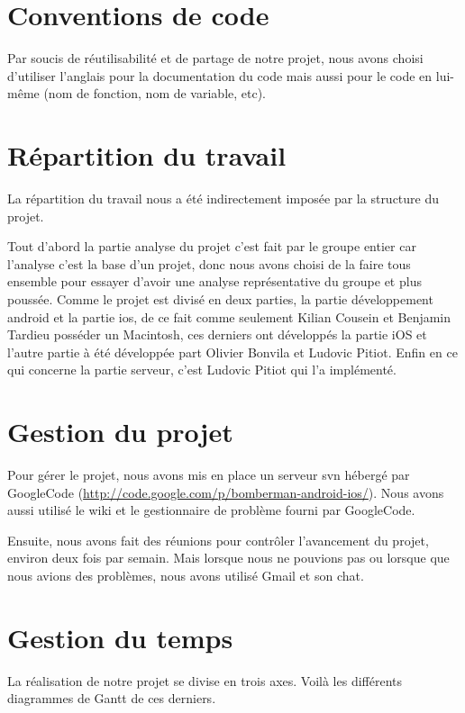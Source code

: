 \section{Conventions de code}
	Par soucis de réutilisabilité et de partage de notre projet, nous avons choisi d'utiliser l'anglais pour la documentation du code mais aussi pour le code en lui-même (nom de fonction, nom de variable, etc).


\section{Répartition du travail}
	La répartition du travail nous a été indirectement imposée par la structure du projet. 
	
	Tout d'abord la partie analyse du projet c'est fait par le groupe entier car
	l'analyse c'est la base d'un projet, donc nous avons choisi de la faire tous ensemble pour essayer d'avoir une analyse représentative du groupe et plus poussée. Comme le projet est divisé en deux parties, la partie développement \gls{android} et la partie \gls{ios}, de ce fait comme seulement Kilian Cousein et Benjamin Tardieu posséder un Macintosh, ces derniers ont développés la partie iOS et l'autre partie à été développée part Olivier Bonvila et Ludovic Pitiot. Enfin en ce qui concerne la partie serveur, c'est Ludovic Pitiot qui l'a implémenté.
	
	
\section{Gestion du projet}
	Pour gérer le projet, nous avons mis en place un serveur \gls{svn} hébergé par GoogleCode (\url{http://code.google.com/p/bomberman-android-ios/}). Nous avons aussi utilisé le wiki et le gestionnaire de problème fourni par GoogleCode.
	
	Ensuite, nous avons fait des réunions pour contrôler l'avancement du projet, environ deux fois par semain. Mais lorsque nous ne pouvions pas ou lorsque que nous avions des problèmes, nous avons utilisé Gmail et son chat.
	

\section{Gestion du temps}
	La réalisation de notre projet se divise en trois axes. Voilà les différents diagrammes de Gantt de ces derniers.
	

